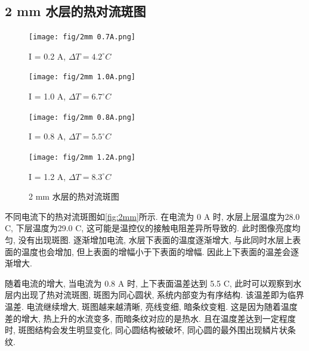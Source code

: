\documentclass[font=default]{mpltx}
\begin{document}
  \subsection{2 mm 水层的热对流斑图}
  \begin{figure}[htbp]      
    \caption{2 mm 水层的热对流斑图}
    \begin{minipage}{0.32\linewidth}
      \vspace{3pt}
      \centerline{\texttt{[image: fig/2mm 0.7A.png]}}
      \centerline{I = 0.2 A, $\Delta T = 4.2^\circ C$}
      \vspace{3pt}
      \centerline{\texttt{[image: fig/2mm 1.0A.png]}}
      \centerline{I = 1.0 A, $\Delta T = 6.7^\circ C$}
    \end{minipage}
    \begin{minipage}{0.32\linewidth}
      \vspace{3pt}
      \centerline{\texttt{[image: fig/2mm 0.8A.png]}}
      \centerline{I = 0.8 A, $\Delta T = 5.5^\circ C$}
      \vspace{3pt}
      \centerline{\texttt{[image: fig/2mm 1.2A.png]}}
      \centerline{I = 1.2 A, $\Delta T = 8.3^\circ C$}
    \end{minipage}
    \label{fig:2mm}
  \end{figure}
  不同电流下的热对流斑图如\autoref{fig:2mm}所示.
  在电流为 0 A 时, 水层上层温度为28.0 \circ C, 下层温度为29.0 \circ C, 这可能是温控仪的接触电阻差异所导致的. 此时图像亮度均匀, 没有出现斑图.
  逐渐增加电流, 水层下表面的温度逐渐增大, 与此同时水层上表面的温度也会增加, 但上表面的增幅小于下表面的增幅. 因此上下表面的温差会逐渐增大.
  \par
  随着电流的增大, 当电流为 0.8 A 时, 上下表面温差达到 5.5 \circ C, 此时可以观察到水层内出现了热对流斑图, 斑图为同心圆状, 系统内部变为有序结构. 该温差即为临界温差.
  电流继续增大, 斑图越来越清晰, 亮线变细, 暗条纹变粗. 这是因为随着温度差的增大, 热上升的水流变多, 而暗条纹对应的是热水. 
  且在温度差达到一定程度时, 斑图结构会发生明显变化, 同心圆结构被破坏, 同心圆的最外围出现鳞片状条纹. 
\end{document}
